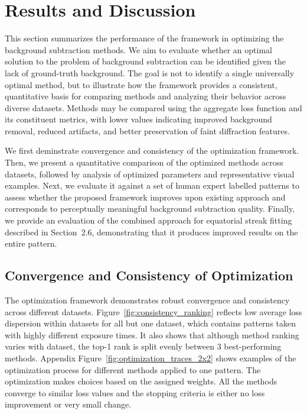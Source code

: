 \documentclass[iucr]{iucrjournals}
\begin{document}
\section{Results and Discussion}

This section summarizes the performance of the framework in optimizing the background subtraction methods. We aim to evaluate whether an optimal solution to the problem of background subtraction can be identified given the lack of ground-truth background. The goal is not to identify a single universally optimal method, but to illustrate how the framework provides a consistent, quantitative basis for comparing methods and analyzing their behavior across diverse datasets. Methods may be compared using the aggregate loss function and its constituent metrics, with lower values indicating improved background removal, reduced artifacts, and better preservation of faint diffraction features.

We first deminstrate convergence and consistency of the optimization framework. Then, we present a quantitative comparison of the optimized methods across datasets, followed by analysis of optimized parameters and representative visual examples. Next, we evaluate it against a set of human expert labelled patterns to assess whether the proposed framework improves upon existing approach and corresponds to perceptually meaningful background subtraction quality. Finally, we provide an evaluation of the combined approach for equatorial streak fitting described in Section~2.6, demonstrating that it produces improved results on the entire pattern. 


\subsection{Convergence and Consistency of Optimization}

The optimization framework demonstrates robust convergence and consistency across different datasets. Figure~\ref{fig:consistency_ranking} reflects low average loss dispersion within datasets for all but one dataset, which contains patterns taken with highly different exposure times. It also shows that although method ranking varies with dataset, the top-1 rank is split evenly between 3 best-performing methods. Appendix Figure~\ref{fig:optimization_traces_2x2} shows examples of the optimization process for different methods applied to one pattern. The optimization makes choices based on the assigned weights. All the methods converge to similar loss values and the stopping criteria is either no loss improvement or very small change. 
\end{document}
